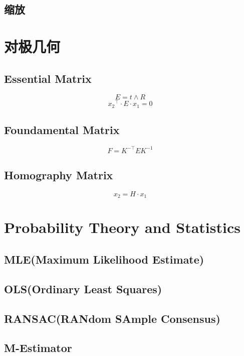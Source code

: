 \subsection{缩放}



\section{对极几何}

\subsection{Essential Matrix}
\begin{equation} E = t \wedge R \end{equation}
\begin{equation} {x_2}^\top \cdot E \cdot x_1 = 0 \end{equation}
 
\subsection{Foundamental Matrix}
\begin{equation} F = K^{-\top} E K^{-1} \end{equation}

\subsection{Homography Matrix}
\begin{equation} x_2 = H \cdot x_1 \end{equation}


\section{Probability Theory and Statistics}
\subsection{MLE(Maximum Likelihood Estimate)}
\subsection{OLS(Ordinary Least Squares)}
\subsection{RANSAC(RANdom SAmple Consensus)}
\subsection{M-Estimator}

